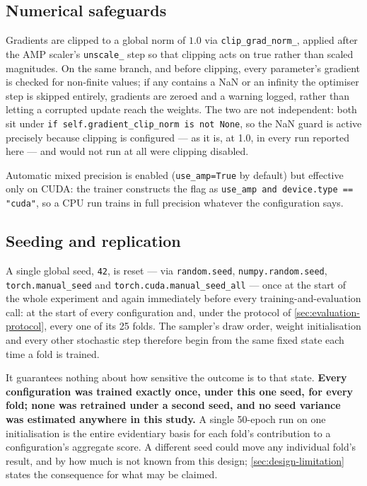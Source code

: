 \subsection{Numerical safeguards}
\label{sec:numerical-safeguards}

Gradients are clipped to a global norm of $1.0$ via \texttt{clip\_grad\_norm\_}, applied after the AMP scaler's \texttt{unscale\_} step so that clipping acts on true rather than scaled magnitudes. On the same branch, and before clipping, every parameter's gradient is checked for non-finite values; if any contains a NaN or an infinity the optimiser step is skipped entirely, gradients are zeroed and a warning logged, rather than letting a corrupted update reach the weights. The two are not independent: both sit under \verb|if self.gradient_clip_norm is not None|, so the NaN guard is active precisely because clipping is configured --- as it is, at 1.0, in every run reported here --- and would not run at all were clipping disabled.

Automatic mixed precision is enabled (\texttt{use\_amp=True} by default) but effective only on CUDA: the trainer constructs the flag as \verb|use_amp and device.type == "cuda"|, so a CPU run trains in full precision whatever the configuration says.

\subsection{Seeding and replication}
\label{sec:seeding}

A single global seed, \texttt{42}, is reset --- via \texttt{random.seed}, \texttt{numpy.random.seed}, \texttt{torch.manual\_seed} and \texttt{torch.cuda.manual\_seed\_all} --- once at the start of the whole experiment and again immediately before every training-and-evaluation call: at the start of every configuration and, under the protocol of \autoref{sec:evaluation-protocol}, every one of its 25 folds. The sampler's draw order, weight initialisation and every other stochastic step therefore begin from the same fixed state each time a fold is trained.

It guarantees nothing about how sensitive the outcome is to that state. \textbf{Every configuration was trained exactly once, under this one seed, for every fold; none was retrained under a second seed, and no seed variance was estimated anywhere in this study.} A single 50-epoch run on one initialisation is the entire evidentiary basis for each fold's contribution to a configuration's aggregate score. A different seed could move any individual fold's result, and by how much is not known from this design; \autoref{sec:design-limitation} states the consequence for what may be claimed.

